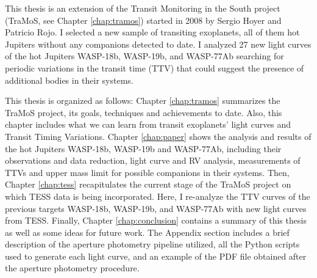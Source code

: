 This thesis is an extension of the Transit Monitoring in the South project (TraMoS, see Chapter \ref{chap:tramos}) started in 2008 by Sergio Hoyer and Patricio Rojo. I selected a new sample of transiting exoplanets, all of them hot Jupiters without any companions detected to date. I analyzed 27 new light curves of the hot Jupiters WASP-18b, WASP-19b, and WASP-77Ab searching for periodic variations in the transit time (TTV) that could suggest the presence of additional bodies in their systems. 

This thesis is organized as follows: Chapter \ref{chap:tramos} summarizes the TraMoS project, its goals, techniques and achievements to date. Also, this chapter includes what we can learn from transit exoplanets' light curves and Transit Timing Variations. Chapter \ref{chap:paper} shows the analysis and results of the hot Jupiters WASP-18b, WASP-19b and WASP-77Ab, including  their observations and data reduction, light curve and RV analysis, measurements of TTVs and upper mass limit for possible companions in their systems. Then, Chapter \ref{chap:tess}  recapitulates the current stage of the TraMoS project on which TESS data is being incorporated. Here, I re-analyze the TTV curves of the previous targets WASP-18b, WASP-19b, and WASP-77Ab with new light curves from TESS. Finally, Chapter \ref{chap:conclusion} contains a summary of this thesis as well as some ideas for future work. The Appendix section includes a brief description of the aperture photometry pipeline utilized, all the Python scripts used to generate each light curve, and an example of the PDF file obtained after the aperture photometry procedure.

